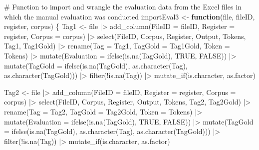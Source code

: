 \documentclass[
  letterpaper,
  DIV=11,
  numbers=noendperiod]{scrreprt}
\newenvironment{Shaded}{\begin{snugshade}}{\end{snugshade}}
\newcommand{\AttributeTok}[1]{\textcolor[rgb]{0.40,0.45,0.13}{#1}}
\newcommand{\CommentTok}[1]{\textcolor[rgb]{0.37,0.37,0.37}{#1}}
\newcommand{\ConstantTok}[1]{\textcolor[rgb]{0.56,0.35,0.01}{#1}}
\newcommand{\ControlFlowTok}[1]{\textcolor[rgb]{0.00,0.23,0.31}{\textbf{#1}}}
\newcommand{\FunctionTok}[1]{\textcolor[rgb]{0.28,0.35,0.67}{#1}}
\newcommand{\NormalTok}[1]{\textcolor[rgb]{0.00,0.23,0.31}{#1}}
\newcommand{\OtherTok}[1]{\textcolor[rgb]{0.00,0.23,0.31}{#1}}
\newcommand{\SpecialCharTok}[1]{\textcolor[rgb]{0.37,0.37,0.37}{#1}}
\begin{document}
\begin{Shaded}
\begin{Highlighting}[]
\CommentTok{\# Function to import and wrangle the evaluation data from the Excel files in which the manual evaluation was conducted}
\NormalTok{importEval3 }\OtherTok{\textless{}{-}} \ControlFlowTok{function}\NormalTok{(file, fileID, register, corpus) \{}
\NormalTok{  Tag1 }\OtherTok{\textless{}{-}}\NormalTok{ file }\SpecialCharTok{|\textgreater{}} 
  \FunctionTok{add\_column}\NormalTok{(}\AttributeTok{FileID =}\NormalTok{ fileID, }\AttributeTok{Register =}\NormalTok{ register, }\AttributeTok{Corpus =}\NormalTok{ corpus) }\SpecialCharTok{|\textgreater{}}
  \FunctionTok{select}\NormalTok{(FileID, Corpus, Register, Output, Tokens, Tag1, Tag1Gold) }\SpecialCharTok{|\textgreater{}} 
  \FunctionTok{rename}\NormalTok{(}\AttributeTok{Tag =}\NormalTok{ Tag1, }\AttributeTok{TagGold =}\NormalTok{ Tag1Gold, }\AttributeTok{Token =}\NormalTok{ Tokens) }\SpecialCharTok{|\textgreater{}} 
  \FunctionTok{mutate}\NormalTok{(}\AttributeTok{Evaluation =} \FunctionTok{ifelse}\NormalTok{(}\FunctionTok{is.na}\NormalTok{(TagGold), }\ConstantTok{TRUE}\NormalTok{, }\ConstantTok{FALSE}\NormalTok{)) }\SpecialCharTok{|\textgreater{}} 
  \FunctionTok{mutate}\NormalTok{(}\AttributeTok{TagGold =} \FunctionTok{ifelse}\NormalTok{(}\FunctionTok{is.na}\NormalTok{(TagGold), }\FunctionTok{as.character}\NormalTok{(Tag), }\FunctionTok{as.character}\NormalTok{(TagGold))) }\SpecialCharTok{|\textgreater{}}
  \FunctionTok{filter}\NormalTok{(}\SpecialCharTok{!}\FunctionTok{is.na}\NormalTok{(Tag)) }\SpecialCharTok{|\textgreater{}} 
  \FunctionTok{mutate\_if}\NormalTok{(is.character, as.factor)}
  
\NormalTok{  Tag2 }\OtherTok{\textless{}{-}}\NormalTok{ file }\SpecialCharTok{|\textgreater{}} 
  \FunctionTok{add\_column}\NormalTok{(}\AttributeTok{FileID =}\NormalTok{ fileID, }\AttributeTok{Register =}\NormalTok{ register, }\AttributeTok{Corpus =}\NormalTok{ corpus) }\SpecialCharTok{|\textgreater{}}
  \FunctionTok{select}\NormalTok{(FileID, Corpus, Register, Output, Tokens, Tag2, Tag2Gold) }\SpecialCharTok{|\textgreater{}} 
  \FunctionTok{rename}\NormalTok{(}\AttributeTok{Tag =}\NormalTok{ Tag2, }\AttributeTok{TagGold =}\NormalTok{ Tag2Gold, }\AttributeTok{Token =}\NormalTok{ Tokens) }\SpecialCharTok{|\textgreater{}} 
  \FunctionTok{mutate}\NormalTok{(}\AttributeTok{Evaluation =} \FunctionTok{ifelse}\NormalTok{(}\FunctionTok{is.na}\NormalTok{(TagGold), }\ConstantTok{TRUE}\NormalTok{, }\ConstantTok{FALSE}\NormalTok{)) }\SpecialCharTok{|\textgreater{}} 
  \FunctionTok{mutate}\NormalTok{(}\AttributeTok{TagGold =} \FunctionTok{ifelse}\NormalTok{(}\FunctionTok{is.na}\NormalTok{(TagGold), }\FunctionTok{as.character}\NormalTok{(Tag), }\FunctionTok{as.character}\NormalTok{(TagGold))) }\SpecialCharTok{|\textgreater{}}
  \FunctionTok{filter}\NormalTok{(}\SpecialCharTok{!}\FunctionTok{is.na}\NormalTok{(Tag)) }\SpecialCharTok{|\textgreater{}} 
  \FunctionTok{mutate\_if}\NormalTok{(is.character, as.factor)}


\end{Highlighting}
\end{Shaded}
\end{document}
